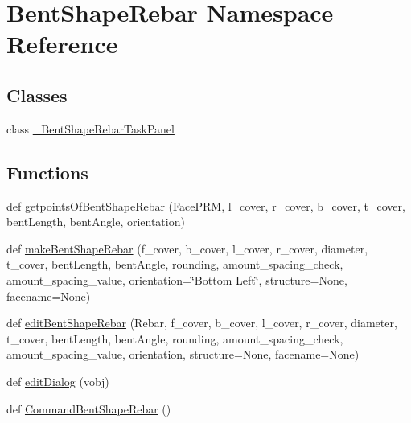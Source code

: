 \hypertarget{namespaceBentShapeRebar}{}\section{Bent\+Shape\+Rebar Namespace Reference}
\label{namespaceBentShapeRebar}
\subsection*{Classes}
\begin{DoxyCompactItemize}
\item 
class \hyperlink{classBentShapeRebar_1_1__BentShapeRebarTaskPanel}{\+\_\+\+Bent\+Shape\+Rebar\+Task\+Panel}
\end{DoxyCompactItemize}
\subsection*{Functions}
\begin{DoxyCompactItemize}
\item 
def \hyperlink{namespaceBentShapeRebar_a33951a8ab21a73bae42af9f81d7c43c3}{getpoints\+Of\+Bent\+Shape\+Rebar} (Face\+P\+RM, l\+\_\+cover, r\+\_\+cover, b\+\_\+cover, t\+\_\+cover, bent\+Length, bent\+Angle, orientation)
\item 
def \hyperlink{namespaceBentShapeRebar_aac46779d3e1905db5a3788917f6e2476}{make\+Bent\+Shape\+Rebar} (f\+\_\+cover, b\+\_\+cover, l\+\_\+cover, r\+\_\+cover, diameter, t\+\_\+cover, bent\+Length, bent\+Angle, rounding, amount\+\_\+spacing\+\_\+check, amount\+\_\+spacing\+\_\+value, orientation=\char`\"{}Bottom Left\char`\"{}, structure=None, facename=None)
\item 
def \hyperlink{namespaceBentShapeRebar_a941d005845cd497c0beb12bb8fef9171}{edit\+Bent\+Shape\+Rebar} (Rebar, f\+\_\+cover, b\+\_\+cover, l\+\_\+cover, r\+\_\+cover, diameter, t\+\_\+cover, bent\+Length, bent\+Angle, rounding, amount\+\_\+spacing\+\_\+check, amount\+\_\+spacing\+\_\+value, orientation, structure=None, facename=None)
\item 
def \hyperlink{namespaceBentShapeRebar_ae5db82a49148a0a8f6fa567fa72d93b2}{edit\+Dialog} (vobj)
\item 
def \hyperlink{namespaceBentShapeRebar_abc4f0ada7811da5cf9174551bc3c6b37}{Command\+Bent\+Shape\+Rebar} ()
\end{DoxyCompactItemize}
